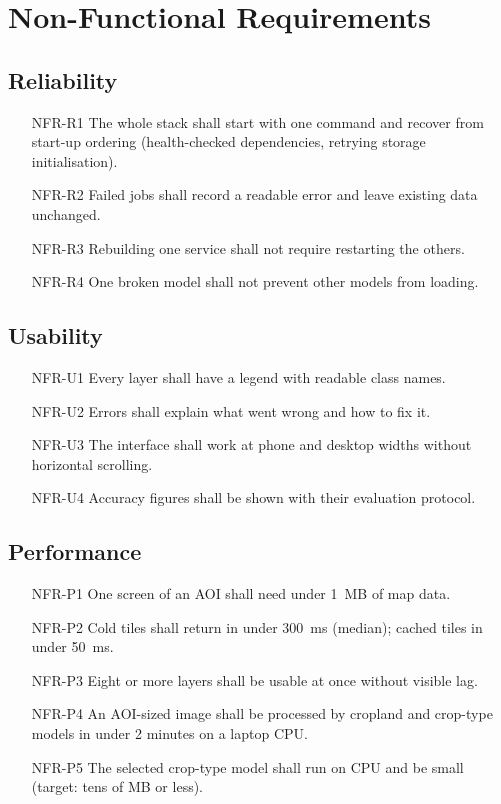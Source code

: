 \section{Non-Functional Requirements}
\subsection{Reliability}
\begin{itemize}[leftmargin=1.8cm]
  \item[NFR-R1] The whole stack shall start with one command and recover from start-up ordering
        (health-checked dependencies, retrying storage initialisation).
  \item[NFR-R2] Failed jobs shall record a readable error and leave existing data unchanged.
  \item[NFR-R3] Rebuilding one service shall not require restarting the others.
  \item[NFR-R4] One broken model shall not prevent other models from loading.
\end{itemize}
\subsection{Usability}
\begin{itemize}[leftmargin=1.8cm]
  \item[NFR-U1] Every layer shall have a legend with readable class names.
  \item[NFR-U2] Errors shall explain what went wrong and how to fix it.
  \item[NFR-U3] The interface shall work at phone and desktop widths without horizontal scrolling.
  \item[NFR-U4] Accuracy figures shall be shown with their evaluation protocol.
\end{itemize}
\subsection{Performance}
\begin{itemize}[leftmargin=1.8cm]
  \item[NFR-P1] One screen of an AOI shall need under 1~MB of map data.
  \item[NFR-P2] Cold tiles shall return in under 300~ms (median); cached tiles in under 50~ms.
  \item[NFR-P3] Eight or more layers shall be usable at once without visible lag.
  \item[NFR-P4] An AOI-sized image shall be processed by cropland and crop-type models in under
        2 minutes on a laptop CPU.
  \item[NFR-P5] The selected crop-type model shall run on CPU and be small (target: tens of MB or
        less).
\end{itemize}
